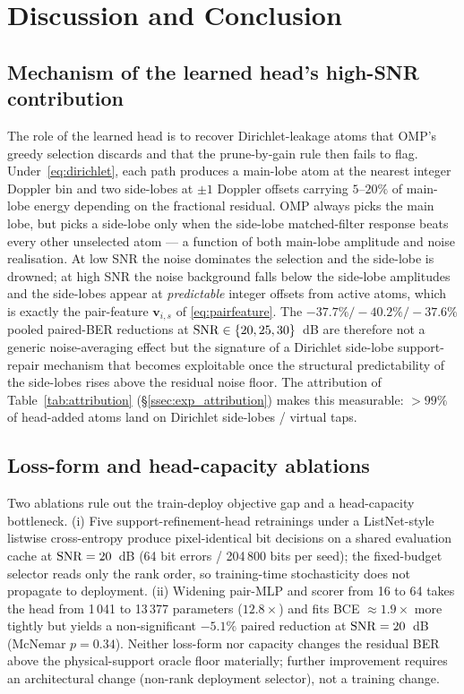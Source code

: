 \section{Discussion and Conclusion}
\label{sec:discussion}

\subsection{Mechanism of the learned head's high-SNR contribution}
\label{ssec:disc_head}

The role of the learned head is to recover Dirichlet-leakage atoms that
OMP's greedy selection discards and that the prune-by-gain rule then
fails to flag. Under~\eqref{eq:dirichlet}, each path produces a
main-lobe atom at the nearest integer Doppler bin and two side-lobes
at $\pm 1$ Doppler offsets carrying $5$--$20\%$ of main-lobe energy
depending on the fractional residual. OMP always picks the main lobe,
but picks a side-lobe only when the side-lobe matched-filter response
beats every other unselected atom --- a function of both main-lobe
amplitude and noise realisation. At low SNR the noise dominates the
selection and the side-lobe is drowned; at high SNR the noise
background falls below the side-lobe amplitudes and the side-lobes
appear at \emph{predictable} integer offsets from active atoms, which
is exactly the pair-feature $\mathbf{v}_{i,s}$ of \eqref{eq:pairfeature}.
The $-37.7\%/-40.2\%/-37.6\%$ pooled paired-BER reductions at
$\mathrm{SNR}\in\{20,25,30\}$~dB are therefore not a generic noise-averaging
effect but the signature of a Dirichlet side-lobe support-repair
mechanism that becomes exploitable once the structural predictability
of the side-lobes rises above the residual noise floor. The
attribution of Table~\ref{tab:attribution} (\S\ref{ssec:exp_attribution})
makes this measurable: $>99\%$ of head-added atoms land on
Dirichlet side-lobes / virtual taps.

\subsection{Loss-form and head-capacity ablations}
\label{ssec:disc_lossform}
Two ablations rule out the train-deploy objective gap and a
head-capacity bottleneck. (i) Five support-refinement-head retrainings under a
ListNet-style listwise cross-entropy produce pixel-identical bit
decisions on a shared evaluation cache at $\mathrm{SNR}=20$~dB (64 bit errors /
204\,800 bits per seed); the fixed-budget selector reads only the rank order,
so training-time stochasticity does not propagate to deployment.
(ii) Widening pair-MLP and scorer from 16 to 64 takes the head from
1\,041 to 13\,377 parameters ($12.8\times$) and fits BCE
$\approx 1.9\times$ more tightly but yields a non-significant $-5.1\%$
paired reduction at $\mathrm{SNR}=20$~dB (McNemar $p=0.34$). Neither
loss-form nor capacity changes the residual BER above the
physical-support oracle floor materially; further improvement requires
an architectural change (non-rank deployment selector), not a training
change.

